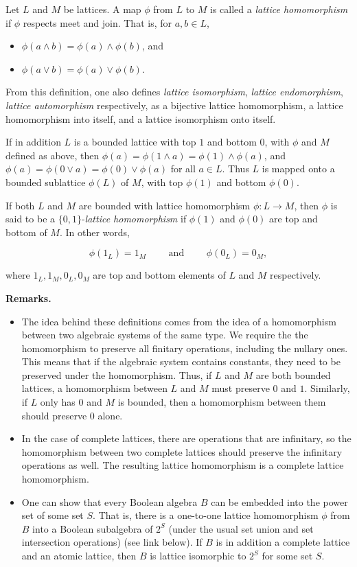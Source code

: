 \documentclass[12pt]{article}
\begin{document}
Let $L$ and $M$ be lattices.  A map $\phi$ from $L$ to $M$ is called a \emph{lattice homomorphism} if $\phi$ respects meet and join.  That is, for $a,b\in L$,

\begin{itemize}
\item $\phi(a\land b)=\phi(a)\land\phi(b)$, and
\item $\phi(a\lor b)=\phi(a)\lor\phi(b)$.
\end{itemize}

From this definition, one also defines \emph{lattice isomorphism}, \emph{lattice endomorphism}, \emph{lattice automorphism} respectively, as a bijective lattice homomorphism, a lattice homomorphism into itself, and a lattice isomorphism onto itself.

If in addition $L$ is a bounded lattice with top $1$ and bottom $0$, with $\phi$ and $M$ defined as above, then $\phi(a)=\phi(1\wedge a)=\phi(1)\wedge\phi(a)$, and $\phi(a)=\phi(0\vee a)=\phi(0)\vee\phi(a)$ for all $a\in L$.  Thus $L$ is mapped onto a bounded sublattice $\phi(L)$ of $M$, with top $\phi(1)$ and bottom $\phi(0)$.

If both $L$ and $M$ are bounded with lattice homomorphism $\phi:L\to M$, then $\phi$ is said to be a $\lbrace 0,1\rbrace$-\emph{lattice homomorphism} if $\phi(1)$ and $\phi(0)$ are top and bottom of $M$.  In other words, 

$$\phi(1_L)=1_M\qquad\mbox{ and }\qquad\phi(0_L)=0_M,$$

where $1_L,1_M,0_L,0_M$ are top and bottom elements of $L$ and $M$ respectively.  

\textbf{Remarks.}  
\begin{itemize}
\item
The idea behind these definitions comes from the idea of a homomorphism between two algebraic systems of the same type.    We require the the homomorphism to preserve all finitary operations, including the nullary ones.  This means that if the algebraic system contains constants, they need to be preserved under the homomorphism.  Thus, if $L$ and $M$ are both bounded lattices, a homomorphism between $L$ and $M$ must preserve $0$ and $1$.  Similarly, if $L$ only has $0$ and $M$ is bounded, then a homomorphism between them should preserve $0$ alone.
\item
In the case of complete lattices, there are operations that are infinitary, so the homomorphism between two complete lattices should preserve the infinitary operations as well.  The resulting lattice homomorphism is a complete lattice homomorphism.
\item
One can show that every Boolean algebra $B$ can be embedded into the power set of some set $S$.  That is, there is a one-to-one lattice homomorphism $\phi$ from $B$ into a Boolean subalgebra of $2^S$ (under the usual set union and set intersection operations) (see link below).  If $B$ is in addition a complete lattice and an atomic lattice, then $B$ is lattice isomorphic to $2^S$ for some set $S$.
\end{itemize}
\end{document}
